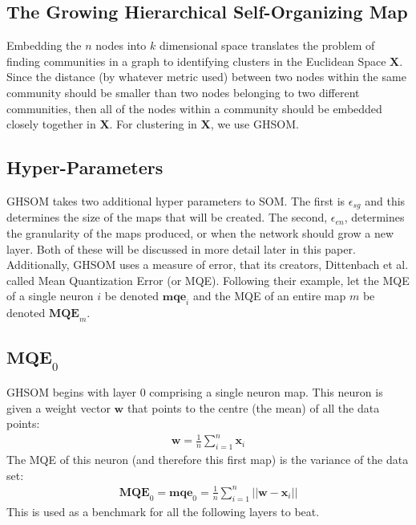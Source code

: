 \documentclass{article}
\begin{document}
\subsection{The Growing Hierarchical Self-Organizing Map}
Embedding the $n$ nodes into $k$ dimensional space translates the problem of finding communities in a graph to identifying clusters in the Euclidean Space $\textbf{X}$. Since the distance (by whatever metric used) between two nodes within the same community should be smaller than two nodes belonging to two different communities, then all of the nodes within a community should be embedded closely together in $\textbf{X}$.
For clustering in $\textbf{X}$, we use GHSOM.

\subsection{Hyper-Parameters}
GHSOM takes two additional hyper parameters to SOM. 
The first is $\epsilon_{sg}$ and this determines the size of the maps that will be created. 
The second, $\epsilon_{en}$, determines the granularity of the maps produced, or when the network should grow a new layer. 
Both of these will be discussed in more detail later in this paper.
Additionally, GHSOM uses a measure of error, that its creators, Dittenbach et al. called Mean Quantization Error (or MQE). 
Following their example, let the MQE of a single neuron $i$ be denoted $\textbf{mqe}_i$ and the MQE of an entire map $m$ be denoted $\textbf{MQE}_m$.

\subsection{$\textbf{MQE}_0$}
GHSOM begins with layer 0 comprising a single neuron map. 
This neuron is given a weight vector $\textbf{w}$ that points to the centre (the mean) of all the data points:
\begin{align}
\textbf{w} = \frac{1}{n} \sum_{i=1}^n \textbf{x}_i
\end{align}
The MQE of this neuron (and therefore this first map) is the variance of the data set:
\begin{align}
\textbf{MQE}_0 = \textbf{mqe}_0 = \frac{1}{n} \sum_{i=1}^n ||\textbf{w} - \textbf{x}_i||
\end{align} 
This is used as a benchmark for all the following layers to beat.
\end{document}
